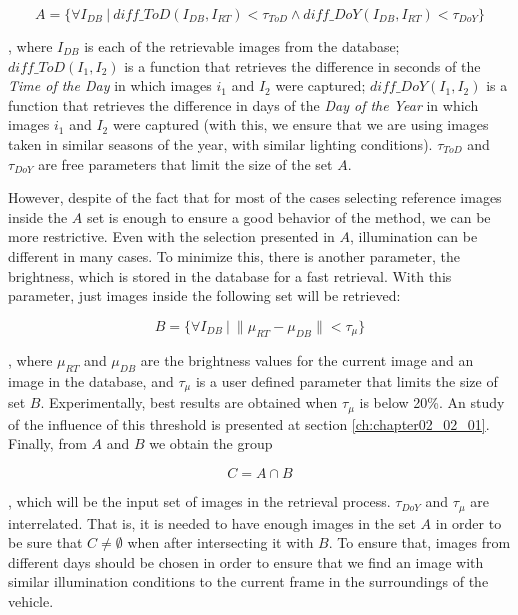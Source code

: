 \begin{equation}\label{eq:cp02_eligible_images_by_time}
A = \{ \forall I_{DB} ~|~ diff\_ToD(I_{DB}, I_{RT}) < \tau_{ToD} \wedge diff\_DoY(I_{DB}, I_{RT}) < \tau_{DoY} \}
\end{equation}

, where $I_{DB}$ is each of the retrievable images from the database; $diff\_ToD(I_1, I_2)$ is a function that retrieves the difference in seconds of the \emph{Time of the Day} in which images $i_1$ and $I_2$ were captured; $diff\_DoY(I_1, I_2)$ is a function that retrieves the difference in days of the \emph{Day of the Year} in which images $i_1$ and $I_2$ were captured (with this, we ensure that we are using images taken in similar seasons of the year, with similar lighting conditions). $\tau_{ToD}$ and $\tau_{DoY}$ are free parameters that limit the size of the set $A$.

However, despite of the fact that for most of the cases selecting reference images inside the $A$ set is enough to ensure a good behavior of the method, we can be more restrictive. Even with the selection presented in $A$, illumination can be different in many cases. To minimize this, there is another parameter, the brightness, which is stored in the database for a fast retrieval. With this parameter, just images inside the following set will be retrieved:

\begin{equation}\label{eq:cp02_eligible_images_by_brightness}
B = \{ \forall I_{DB} ~|~ \| \mu_{RT} - \mu_{DB} \| < \tau_{\mu} \}
\end{equation}

, where $\mu_{RT}$ and $\mu_{DB}$ are the brightness values for the current image and an image in the database, and $\tau_{\mu}$ is a user defined parameter that limits the size of set $B$. Experimentally, best results are obtained when $\tau_{\mu}$ is below 20\%. An study of the influence of this threshold is presented at section \ref{ch:chapter02_02_01}. Finally, from $A$ and $B$ we obtain the group

\begin{equation}\label{eq:cp02_eligible_images}
C = A \cap B
\end{equation}

, which will be the input set of images in the retrieval process. $\tau_{DoY}$ and $\tau_{\mu}$ are interrelated. That is, it is needed to have enough images in the set $A$ in order to be sure that $C \neq \emptyset$ when after intersecting it with $B$. To ensure that, images from different days should be chosen in order to ensure that we find an image with similar illumination conditions to the current frame in the surroundings of the vehicle.

